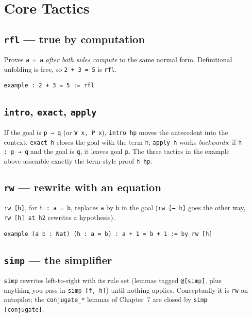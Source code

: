 \documentclass[11pt, a4paper, oneside]{book}
\newcommand{\lc}[1]{\texttt{#1}}
\begin{document}
\section{Core Tactics}

\subsection*{\lc{rfl} --- true by computation}

Proves \lc{a = a} \emph{after both sides compute} to the same normal form.
Definitional unfolding is free, so \lc{2 + 3 = 5} is \lc{rfl}.

\begin{leanbox}
\begin{verbatim}
example : 2 + 3 = 5 := rfl
\end{verbatim}
\end{leanbox}

\subsection*{\lc{intro}, \lc{exact}, \lc{apply}}

If the goal is \lc{p → q} (or \lc{∀ x, P x}), \lc{intro hp} moves the antecedent
into the context. \lc{exact h} closes the goal with the term \lc{h}; \lc{apply h}
works \emph{backwards}: if \lc{h : p → q} and the goal is \lc{q}, it leaves goal
\lc{p}. The three tactics in the example above assemble exactly the term-style
proof \lc{h hp}.

\subsection*{\lc{rw} --- rewrite with an equation}

\lc{rw [h]}, for \lc{h : a = b}, replaces \lc{a} by \lc{b} in the goal
(\lc{rw [← h]} goes the other way, \lc{rw [h] at h2} rewrites a hypothesis).

\begin{leanbox}
\begin{verbatim}
example (a b : Nat) (h : a = b) : a + 1 = b + 1 := by rw [h]
\end{verbatim}
\end{leanbox}

\subsection*{\lc{simp} --- the simplifier}

\lc{simp} rewrites left-to-right with its rule set (lemmas tagged \lc{@[simp]},
plus anything you pass in \lc{simp [f, h]}) until nothing applies. Conceptually
it is \lc{rw} on autopilot; the \lc{conjugate\_*} lemmas of Chapter~7 are closed
by \lc{simp [conjugate]}.
\end{document}
